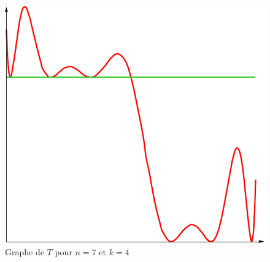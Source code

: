 \begin{figure}[ht]
   \centering
   \includegraphics{Estieltjes_1.pdf}
   \caption{Graphe de $T$ pour $n=7$ et $k=4$}
   \label{fig:Estieltjes_1}
\end{figure}

